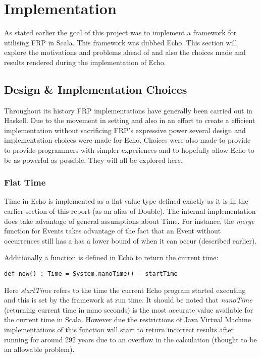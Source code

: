 \chapter{Implementation}
  As stated earlier the goal of this project was to implement a framework for utilising FRP in Scala. 
  This framework was dubbed Echo. This section will explore the motivations and problems ahead of
  and also the choices made and results rendered during the implementation of Echo.
  
  \section{Design \& Implementation Choices}
  Throughout its history FRP implementations have generally been carried out in Haskell. Due to the movement
  in setting and also in an effort to create a efficient implementation without sacrificing FRP's expressive power
  several design and implementation choices were made for Echo. Choices were also made
  to provide to provide programmers with simpler experiences and to hopefully allow Echo to be
  as powerful as possible. They will all be explored here.
  
    \subsection{Flat Time}
      Time in Echo is implemented as a flat value type defined exactly as it is in the earlier
      section of this report (as an alias of Double). The internal implementation does take advantage
      of general assumptions about Time. For instance, the \emph{merge} function for Events takes advantage
      of the fact that an Event without occurrences still has a has a lower bound of when it can occur (described
      earlier). 
      
      Additionally a function is defined in Echo to return the current time:
      
\begin{verbatim}
def now() : Time = System.nanoTime() - startTime
\end{verbatim}      

      Here \emph{startTime} refers to the time the current Echo program started executing and this is
      set by the framework at run time. It should be noted that \emph{nanoTime} (returning current time in
      nano seconds) is the most accurate value available for the current time in Scala. However due the restrictions
      of Java Virtual Machine implementations of this function will start to return incorrect results 
      after running for around 292 years due to an overflow in the calculation (thought to be an allowable
      problem).
      
